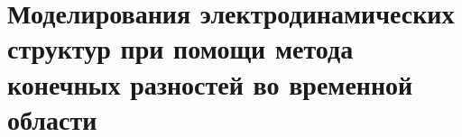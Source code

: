 \chapter{
    Моделирования электродинамических структур при помощи метода конечных
    разностей во временной области}

